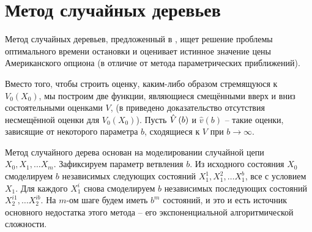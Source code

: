 \chapter{Метод случайных деревьев}

Метод случайных деревьев, предложенный в \cite{Broadie1997}, ищет решение проблемы оптимального времени остановки и оценивает истинное значение цены Американского опциона (в отличие от метода параметрических приближений).

\par Вместо того, чтобы строить оценку, каким-либо образом стремящуюся к $V_0\left(X_0\right)$, мы построим две функции, являющиеся смещёнными вверх и вниз состоятельными оценками $V$, (в \cite{Broadie1997} приведено доказательство отсутствия несмещённой оценки для $V_0\left(X_0\right)$). Пусть $\hat{V}\left(b\right)$ и $\hat{v}\left(b\right)$ -- такие оценки, зависящие от некоторого параметра $b$, сходящиеся к $V$ при $b\to\infty$.
\par Метод случайного дерева основан на моделировании случайной цепи $X_0, X_1, \ldots X_m$. Зафиксируем параметр ветвления $b$. Из исходного состояния $X_0$ смоделируем $b$ независимых следующих состояний $X_1^1, X_1^2, \ldots X_1^b$, все с условием $X_1$. Для каждого $X_1^i$ снова смоделируем $b$ независимых последующих состояний $X_2^{i1}, \ldots X_2^{ib}$. На $m$-ом шаге будем иметь $b^m$ состояний, и это и есть источник основного недостатка этого метода -- его экспоненциальной алгоритмической сложности.
